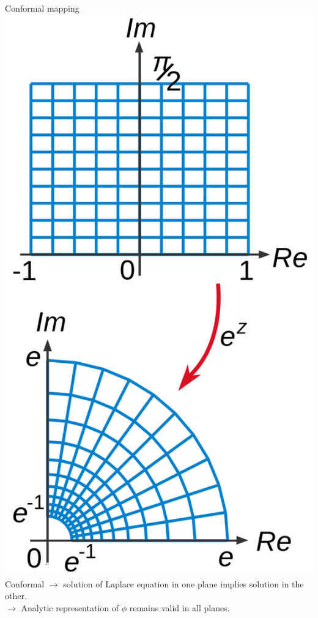 \documentclass{sintefbeamer}
\renewcommand{\_}[1]{_\mr{#1}}
\begin{document}
\begin{frame}{Conformal mapping}
	\includegraphics[width=.22\framewidth]{1200px-Biholomorphism_illustration.svg.png}\\
	
	Conformal  $\longrightarrow$  solution of Laplace equation in one plane implies solution in the other.\\
	 $\longrightarrow$ Analytic representation of $\phi$ remains valid in all planes.
\end{frame}
\end{document}
